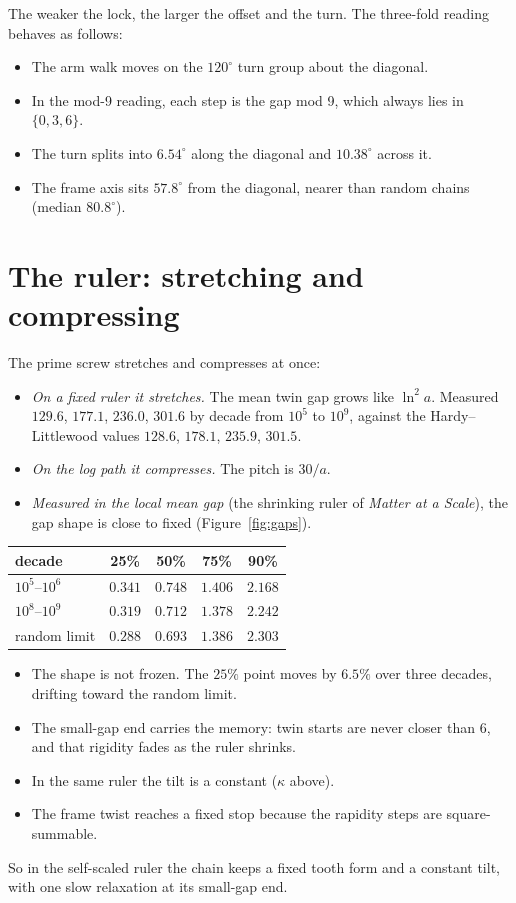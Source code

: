 \documentclass[11pt]{article}
\theoremstyle{definition}
\theoremstyle{remark}
\begin{document}
\noindent The weaker the lock, the larger the offset and the turn. The three-fold reading behaves as follows:
\begin{itemize}
\item The arm walk moves on the $120^\circ$ turn group about the diagonal.
\item In the mod-9 reading, each step is the gap mod 9, which always lies in $\{0,3,6\}$.
\item The turn splits into $6.54^\circ$ along the diagonal and $10.38^\circ$ across it.
\item The frame axis sits $57.8^\circ$ from the diagonal, nearer than random chains (median $80.8^\circ$).
\end{itemize}

\section{The ruler: stretching and compressing}

The prime screw stretches and compresses at once:
\begin{itemize}
\item \emph{On a fixed ruler it stretches.} The mean twin gap grows like $\ln^2a$. Measured $129.6$, $177.1$, $236.0$, $301.6$ by decade from $10^5$ to $10^9$, against the Hardy--Littlewood values $128.6$, $178.1$, $235.9$, $301.5$.
\item \emph{On the log path it compresses.} The pitch is $30/a$.
\item \emph{Measured in the local mean gap} (the shrinking ruler of \emph{Matter at a Scale}), the gap shape is close to fixed (Figure~\ref{fig:gaps}).
\end{itemize}

\begin{center}
\begin{tabular}{lcccc}
\toprule
decade & 25\% & 50\% & 75\% & 90\%\\
\midrule
$10^5$--$10^6$ & $0.341$ & $0.748$ & $1.406$ & $2.168$\\
$10^8$--$10^9$ & $0.319$ & $0.712$ & $1.378$ & $2.242$\\
random limit & $0.288$ & $0.693$ & $1.386$ & $2.303$\\
\bottomrule
\end{tabular}
\end{center}

\begin{itemize}
\item The shape is not frozen. The $25\%$ point moves by $6.5\%$ over three decades, drifting toward the random limit.
\item The small-gap end carries the memory: twin starts are never closer than $6$, and that rigidity fades as the ruler shrinks.
\item In the same ruler the tilt is a constant ($\kappa$ above).
\item The frame twist reaches a fixed stop because the rapidity steps are square-summable.
\end{itemize}
So in the self-scaled ruler the chain keeps a fixed tooth form and a constant tilt, with one slow relaxation at its small-gap end.
\end{document}
